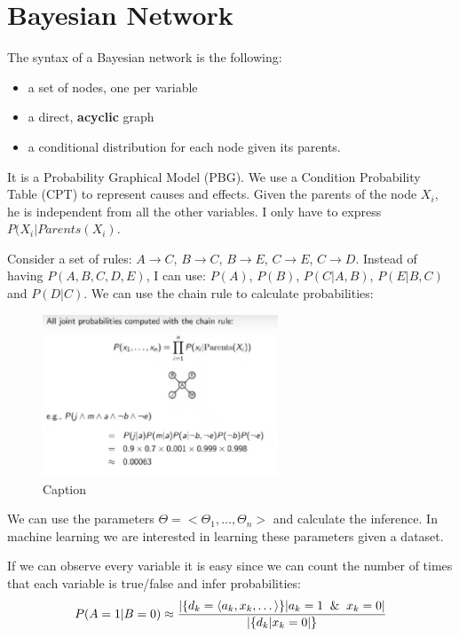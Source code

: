 \section{Bayesian Network}
The syntax of a Bayesian network is the following:
\begin{itemize}
    \item a set of nodes, one per variable
    \item a direct, \textbf{acyclic} graph
    \item a conditional distribution for each node given its parents.
\end{itemize}

It is a Probability Graphical Model (PBG). We use a Condition Probability Table (CPT) to represent causes and effects. Given the parents of the node $X_{i}$, he is independent from all the other variables. I only have to express $P(X_{i} | Parents(X_{i})$.

Consider a set of rules: $A\xrightarrow{}C$, $B\xrightarrow{}C$, $B\xrightarrow{}E$, $C\xrightarrow{}E$, $C\xrightarrow{}D$. Instead of having $P(A, B, C, D, E)$, I can use: $P(A)$, $P(B)$, $P(C|A,B)$, $P(E|B,C)$ and $P(D|C)$. We can use the chain rule to calculate probabilities:
\begin{figure}[H]
    \centering
    \includegraphics[width=7cm]{images/BayesianNetwork/Bayesian_Networks.png}
    \caption{Caption}
    \label{fig:Bayesian_networks}
\end{figure}

We can use the parameters $\Theta = <\Theta_{1}, \dots, \Theta_{n}>$ and calculate the inference. In machine learning we are interested in learning these parameters given a dataset.

If we can observe every variable it is easy since we can count the number of times that each variable is true/false and infer probabilities:
\begin{equation}
    P(A=1 | B = 0) \approx \frac{|\{d_{k} = \langle a_{k}, x_{k}, \dots\rangle \}| a_{k} = 1 \And x_{k} = 0|}{|\{d_{k} | x_{k} = 0|\}}
\end{equation}

